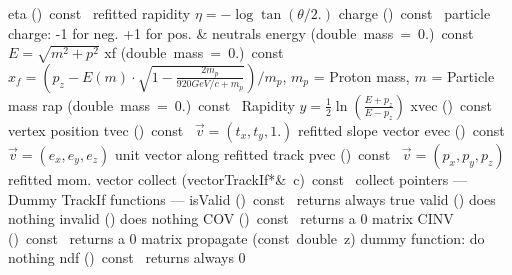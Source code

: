 \documentclass{article}
\begin{document}
\begin{cxxentry}
\begin{cxxclass}
\begin{cxxpublic}
        {}
\label{cxx.2.2.17}
        {eta}
        {()\ const\ }
        { refitted rapidity $\eta = -\log\tan(\theta/2.)$}
        {}
\label{cxx.2.2.18}
        {charge}
        {()\ const\ }
        { particle charge: -1 for neg. +1 for pos. \& neutrals}
        {}
\label{cxx.2.2.19}
        {energy}
        {(double\ mass\ =\ 0.)\ const\ }
        { $E = \sqrt{m^2 + p^2}$}
        {}
\label{cxx.2.2.20}
        {xf}
        {(double\ mass\ =\ 0.)\ const\ }
        {$x_f = (p_z - E(m)\cdot\sqrt{1 - \frac{2m_p}{920 GeV/c + m_p}})/m_p$,
$m_p$ = Proton mass, $m$ = Particle mass }
        {}
\label{cxx.2.2.21}
        {rap}
        {(double\ mass\ =\ 0.)\ const\ }
        { Rapidity $y = \frac{1}{2}\ln(\frac{E+p_z}{E-p_z})$}
        {}
\label{cxx.2.2.22}
        {xvec}
        {()\ const\ }
        { vertex position}
        {}
\label{cxx.2.2.23}
        {tvec}
        {()\ const\ }
        { $\vec{v} = (t_x,t_y,1.)$ refitted slope vector}
        {}
\label{cxx.2.2.24}
        {evec}
        {()\ const\ }
        { $\vec{v} = (e_x,e_y,e_z)$ unit vector along refitted track}
        {}
\label{cxx.2.2.25}
        {pvec}
        {()\ const\ }
        { $\vec{v} = (p_x,p_y,p_z)$ refitted mom. vector}
        {}
\label{cxx.2.2.26}
        {collect}
        {(vector\<TrackIf*\>\&\ c)\ const\ }
        { collect pointers}
        {}
\label{cxx.2.2.27}
\cxxitem{}
        {--- Dummy TrackIf functions --- }
        {}
        {}
        {}
\label{cxx.2.2.28}
        {isValid}
        {()\ const\ }
        { returns always true}
        {}
\label{cxx.2.2.29}
        {valid}
        {()}
        { does nothing}
        {}
\label{cxx.2.2.30}
        {invalid}
        {()}
        { does nothing}
        {}
\label{cxx.2.2.31}
        {COV}
        {()\ const\ }
        { returns a 0 matrix}
        {}
\label{cxx.2.2.32}
        {CINV}
        {()\ const\ }
        { returns a 0 matrix}
        {}
\label{cxx.2.2.33}
        {propagate}
        {(const\ double\ z)}
        { dummy function: do nothing}
        {}
\label{cxx.2.2.34}
        {ndf}
        {()\ const\ }
        { returns always 0}
        {}
\label{cxx.2.2.35}

\end{cxxpublic}
\end{cxxclass}
\end{cxxentry}
\end{document}
